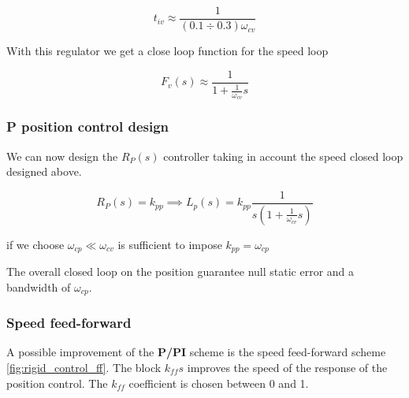 $$ t_{iv} \approx \frac{1}{(0.1 \div 0.3)\omega_{cv}} $$

With this regulator we get a close loop function for the speed loop 

$$ F_v(s) \approx \frac{1}{1 + \frac{1}{\omega_{cv}}s} $$

\subsubsection{P position control design}

We can now design the $R_P(s)$ controller taking in account the speed closed loop designed above.

$$
R_{P}(s) = k_{pp} \implies
L_p(s) = k_{pp} \frac{1}{s \left(1 + \frac{1}{\omega_{cv}} s\right)}
$$

if we choose $\omega_{cp} \ll \omega_{cv}$ is sufficient to impose $k_{pp} = \omega_{cp}$

The overall closed loop on the position guarantee null static error and a bandwidth of $\omega_{cp}$.

\subsubsection{Speed feed-forward}

A possible improvement of the \textbf{P/PI} scheme is the speed feed-forward scheme \autoref{fig:rigid_control_ff}. The block $k_{ff}s$ improves the speed of the response of the position control. The $k_{ff}$ coefficient is chosen between 0 and 1.

